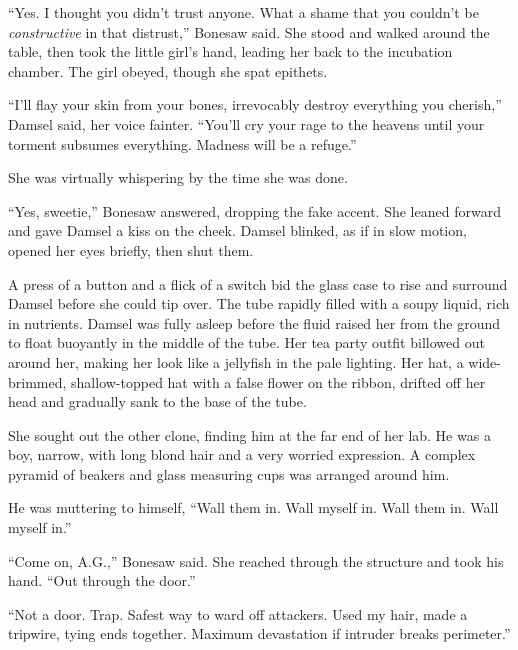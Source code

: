 ``Yes.  I thought you didn't trust anyone.  What a shame that you couldn't be \emph{constructive} in that distrust,'' Bonesaw said.  She stood and walked around the table, then took the little girl's hand, leading her back to the incubation chamber.  The girl obeyed, though she spat epithets.



``I'll flay your skin from your bones, irrevocably destroy everything you cherish,'' Damsel said, her voice fainter.  ``You'll cry your rage to the heavens until your torment subsumes everything.  Madness will be a refuge.''



She was virtually whispering by the time she was done.



``Yes, sweetie,'' Bonesaw answered, dropping the fake accent.  She leaned forward and gave Damsel a kiss on the cheek.  Damsel blinked, as if in slow motion, opened her eyes briefly, then shut them.



A press of a button and a flick of a switch bid the glass case to rise and surround Damsel before she could tip over.  The tube rapidly filled with a soupy liquid, rich in nutrients.  Damsel was fully asleep before the fluid raised her from the ground to float buoyantly in the middle of the tube.  Her tea party outfit billowed out around her, making her look like a jellyfish in the pale lighting.  Her hat, a wide-brimmed, shallow-topped hat with a false flower on the ribbon, drifted off her head and gradually sank to the base of the tube.



She sought out the other clone, finding him at the far end of her lab.  He was a boy, narrow, with long blond hair and a very worried expression.  A complex pyramid of beakers and glass measuring cups was arranged around him.



He was muttering to himself, ``Wall them in.  Wall myself in.  Wall them in.  Wall myself in.''



``Come on, A.G.,'' Bonesaw said.  She reached through the structure and took his hand.  ``Out through the door.''



``Not a door.  Trap.  Safest way to ward off attackers.  Used my hair, made a tripwire, tying ends together.  Maximum devastation if intruder breaks perimeter.''



